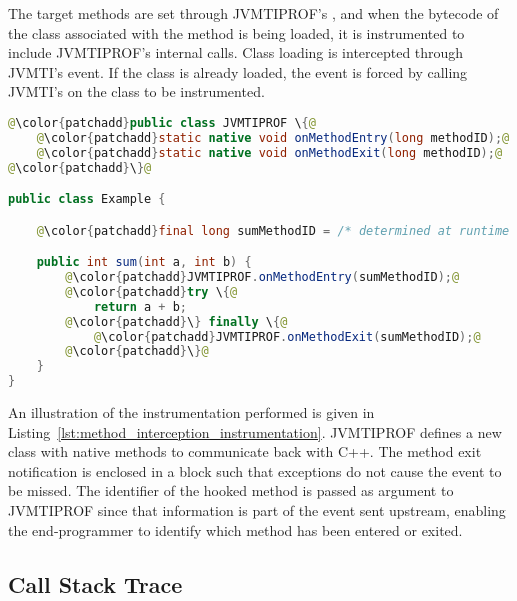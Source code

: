 The target methods are set through JVMTIPROF's , and when the bytecode of the class associated with the method is being loaded, it is instrumented to include JVMTIPROF's internal calls. Class loading is intercepted through JVMTI's   event. If the class is already loaded, the event is forced by calling JVMTI's  on the class to be instrumented.

\begin{lstlisting}[language=Java, escapechar=@, caption=Example instrumentation applied by method interception. Instrumented code is in green. The \code{sum} method is modified such that JVMTIPROF is notified about entries and exits on it.,label=lst:method_interception_instrumentation]
@\color{patchadd}public class JVMTIPROF \{@
    @\color{patchadd}static native void onMethodEntry(long methodID);@
    @\color{patchadd}static native void onMethodExit(long methodID);@
@\color{patchadd}\}@

public class Example {

    @\color{patchadd}final long sumMethodID = /* determined at runtime */;@

    public int sum(int a, int b) {
        @\color{patchadd}JVMTIPROF.onMethodEntry(sumMethodID);@
        @\color{patchadd}try \{@
            return a + b;
        @\color{patchadd}\} finally \{@
            @\color{patchadd}JVMTIPROF.onMethodExit(sumMethodID);@
        @\color{patchadd}\}@
    }
}
\end{lstlisting}

An illustration of the instrumentation performed is given in Listing~\ref{lst:method_interception_instrumentation}. JVMTIPROF defines a new class with native methods to communicate back with C++. The method exit notification is enclosed in a  block such that exceptions do not cause the event to be missed. The identifier of the hooked method is passed as argument to JVMTIPROF since that information is part of the event sent upstream, enabling the end-programmer to identify which method has been entered or exited.





\subsection{Call Stack Trace} \label{sec:impl_callstacktrace}

